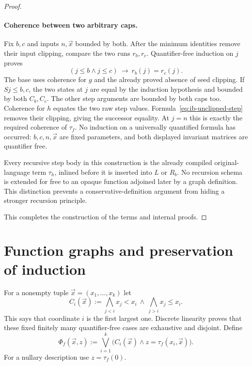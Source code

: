 \begin{proof}
\paragraph{Coherence between two arbitrary caps.}
Fix $b,c$ and inputs $n,\vec x$ bounded by both.  After the minimum
identities remove their input clipping, compare the two runs $r_b,r_c$.
Quantifier-free induction on $j$ proves
\[
             (j\leq b\wedge j\leq c)\ \longrightarrow\ r_b(j)=r_c(j).
 \tag{Two-cap invariant}\label{eq:ib-two-cap-invariant}
\]
The base uses coherence for $g$ and the already proved absence of seed
clipping.  If $Sj\leq b,c$, the two states at $j$ are equal by the
induction hypothesis and bounded by both $C_b,C_c$.  The other step
arguments are bounded by both caps too.  Coherence for $h$ equates
the two raw step values.  Formula~\eqref{eq:ib-unclipped-step}
removes their clipping, giving the successor equality.  At $j=n$
this is exactly the required coherence of $\tau_f$.
No induction on a universally quantified formula has occurred:
$b,c,n,\vec x$ are fixed parameters, and both displayed invariant
matrices are quantifier free.

Every recursive step body in this construction is the already compiled
original-language term $\tau_h$, inlined before it is inserted into $L$
or $R_b$. No recursion schema is extended for free to an opaque function
adjoined later by a graph definition. This distinction prevents a
conservative-definition argument from hiding a stronger recursion principle.

This completes the construction of the terms and internal proofs.
\end{proof}

\section{Function graphs and preservation of induction}
\label{sec:internal-function-graphs}

For a nonempty tuple $\vec x=(x_1,\ldots,x_k)$ let
\[
 C_i(\vec x):=
 \bigwedge_{j<i}x_j<x_i\ \wedge\
 \bigwedge_{j>i}x_j\leq x_i.
\]
This says that coordinate $i$ is the first largest one.  Discrete
linearity proves that these fixed finitely many quantifier-free cases
are exhaustive and disjoint.  Define
\[
 \Phi_f(\vec x,z):=
 \bigvee_{i=1}^{k}
 \bigl(C_i(\vec x)\wedge z=\tau_f(x_i,\vec x)\bigr).
 \tag{Graph}\label{eq:ib-graph}
\]
For a nullary description use $z=\tau_f(0)$.

